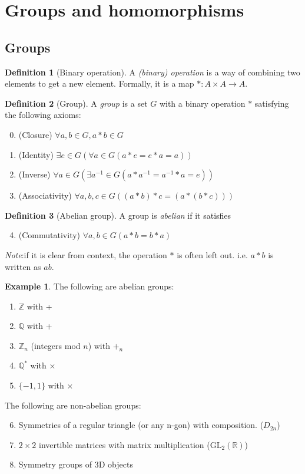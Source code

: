 \documentclass[a4paper]{article}
\theoremstyle{definition}
\newtheorem*{defi}{Definition}
\newtheorem*{eg}{Example}
\newcommand{\note}{\noindent \emph{Note}:\;}
\newcommand{\Z}{\mathbb{Z}}
\newcommand{\Q}{\mathbb{Q}}
\newcommand{\R}{\mathbb{R}}
\newcommand{\GL}{\mathrm{GL}}
\let\stdsection\section
\renewcommand\section{\newpage\stdsection}
\begin{document}
\section{Groups and homomorphisms}
\subsection{Groups}
\begin{defi}[Binary operation]
  A \emph{(binary) operation} is a way of combining two elements to get a new element. Formally, it is a map $*: A \times A \rightarrow A$.
\end{defi}
\begin{defi}[Group]
  A \emph{group} is a set $G$ with a binary operation $*$ satisfying the following axioms:
  \begin{enumerate}[label=\arabic{*}.]
    \setcounter{enumi}{-1}
  \item (Closure) $\forall a, b\in G, a*b\in G$
  \item (Identity) $\exists e\in G(\forall a\in G (a*e = e*a = a))$
  \item (Inverse) $\forall a\in G(\exists a^{-1}\in G (a*a^{-1} = a^{-1}*a = e))$
  \item (Associativity) $\forall a, b, c\in G( (a*b)*c = (a*(b*c)))$
  \end{enumerate}
\end{defi}
\begin{defi}[Abelian group]
  A group is \emph{abelian} if it satisfies
  \begin{enumerate}[label=\arabic{*}.]
    \setcounter{enumi}{3}
  \item (Commutativity) $\forall a, b\in G (a*b = b*a)$
  \end{enumerate}
\end{defi}
\note if it is clear from context, the operation $*$ is often left out. i.e. $a*b$ is written as $ab$.
\begin{eg}
  The following are abelian groups:
  \begin{enumerate}
  \item $\Z$ with +
  \item $\Q$ with +
  \item $\Z_n$ (integers mod $n$) with $+_n$
  \item $\Q^*$ with $\times$
  \item $\{-1, 1\}$ with $\times$
  \end{enumerate}
  The following are non-abelian groups:
  \begin{enumerate}
    \setcounter{enumi}{5}
  \item Symmetries of a regular triangle (or any n-gon) with composition. ($D_{2n}$)
  \item $2\times 2$ invertible matrices with matrix multiplication ($\GL_2(\R)$)
  \item Symmetry groups of 3D objects
  \end{enumerate}
\end{eg}
\end{document}
